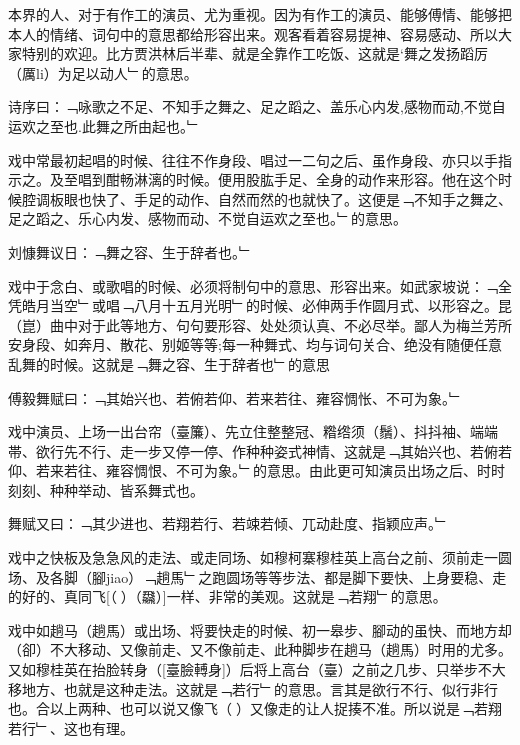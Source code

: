 \documentclass{zhvt-classic}
\begin{document}
本界的人、对于有作工的演员、尤为重视。因为有作工的演员、能够傅情、能够把本人的情绪、词句中的意思都给形容出来。观客看着容易提神、容易感动、所以大家特别的欢迎。比方贾洪林后半辈、就是全靠作工吃饭、这就是‘舞之发扬蹈厉（厲li）为足以动人﹂的意思。

\begin{preface}
  诗序曰：﹁咏歌之不足、不知手之舞之、足之蹈之、盖乐心内发,感物而动,不觉自运欢之至也.此舞之所由起也。﹂
\end{preface}

戏中常最初起唱的时候、往往不作身段、唱过一二句之后、虽作身段、亦只以手指示之。及至唱到酣畅淋漓的时候。便用股肱手足、全身的动作来形容。他在这个时候腔调板眼也快了、手足的动作、自然而然的也就快了。这便是﹁不知手之舞之、足之蹈之、乐心内发、感物而动、不觉自运欢之至也。﹂的意思。

\begin{preface}
  刘慷舞议日：﹁舞之容、生于辞者也。﹂
\end{preface}

戏中于念白、或歌唱的时候、必须将制句中的意思、形容出来。如武家坡说：﹁全凭皓月当空﹂或唱﹁八月十五月光明﹂的时候、必伸两手作圆月式、以形容之。昆（崑）曲中对于此等地方、句句要形容、处处须认真、不必尽举。鄙人为梅兰芳所安身段、如奔月、散花、别姬等等;每一种舞式、均与词句关合、绝没有随便任意乱舞的时候。这就是﹁舞之容、生于辞者也﹂的意思

\begin{preface}
  傅毅舞赋曰：﹁其始兴也、若俯若仰、若来若往、雍容惆怅、不可为象。﹂
\end{preface}

戏中演员、上场一出台帘（臺簾）、先立住整整冠、糌绺须（鬚）、抖抖袖、端端帯、欲行先不行、走一步又停一停、作种种姿式神情、这就是﹁其始兴也、若俯若仰、若来若往、雍容惆恨、不可为象。﹂的意思。由此更可知演员出场之后、时时刻刻、种种举动、皆系舞式也。

\begin{preface}
  舞赋又曰：﹁其少进也、若翔若行、若竦若倾、兀动赴度、指颖应声。﹂
\end{preface}


戏中之快板及急急风的走法、或走同场、如穆柯寨穆桂英上高台之前、须前走一圆场、及各脚（腳jiao）﹁趟馬﹂之跑圆场等等步法、都是脚下要快、上身要稳、走的好的、真同飞[（𮸽）（飝）]一样、非常的美观。这就是﹁若翔﹂的意思。

戏中如趟马（趟馬）或出场、将要快走的时候、初一皋步、腳动的虽快、而地方却（卻）不大移动、又像前走、又不像前走、此种脚步在趟马（趟馬）时用的尤多。又如穆桂英在抬脸转身（[臺臉𨍭身]）后将上高台（臺）之前之几步、只举步不大移地方、也就是这种走法。这就是﹁若行﹂的意思。言其是欲行不行、似行非行也。合以上两种、也可以说又像飞（𮸽）又像走的让人捉揍不准。所以说是﹁若翔若行﹂、这也有理。
\end{document}
